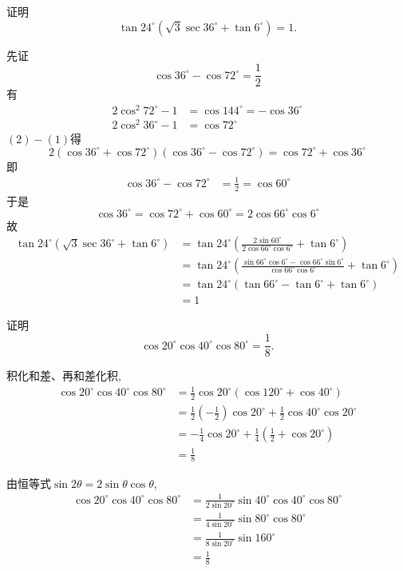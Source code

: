 \begin{questions}
    \question 证明
    \[
    \tan 24^\circ (\sqrt{3} \sec 36^\circ + \tan 6^\circ)=1.
    \]
    \begin{solution}
        先证
        \[
        \cos 36^\circ - \cos 72^\circ = \frac{1}{2}
        \]
        有
        \begin{align*}
        2\cos^2 72^\circ - 1 &= \cos 144^\circ = -\cos 36^\circ \tag{1} \\
        2\cos^2 36^\circ - 1 &= \cos 72^\circ \tag{2}
        \end{align*}
        $(2)-(1)$得
        \[
        2(\cos 36^\circ + \cos 72^\circ)(\cos 36^\circ - \cos 72^\circ) = \cos 72^\circ + \cos 36^\circ
        \]
        即
        \begin{align*}
        \cos 36^\circ - \cos 72^\circ &= \frac{1}{2} = \cos 60^\circ 
        \end{align*}
        于是
        \[
        \cos 36^\circ = \cos 72^\circ + \cos 60^\circ = 2\cos 66^\circ \cos 6^\circ
        \]
        故
        \begin{align*}
        \tan 24^\circ (\sqrt{3} \sec 36^\circ + \tan 6^\circ) 
        &= \tan 24^\circ \left( \frac{2\sin 60^\circ}{2\cos 66^\circ \cos 6^\circ} + \tan 6^\circ \right) \\
        &= \tan 24^\circ \left( \frac{\sin 66^\circ \cos 6^\circ - \cos 66^\circ \sin 6^\circ}{\cos 66^\circ \cos 6^\circ} + \tan 6^\circ \right) \\
        &= \tan 24^\circ (\tan 66^\circ - \tan 6^\circ + \tan 6^\circ) \\
        &= 1
        \end{align*}
    \end{solution}
    
    \question 证明 
    \[
    \cos 20^\circ \cos 40^\circ \cos 80^\circ = \frac{1}{8}.
    \]
    \begin{solution}
        积化和差、再和差化积,
        \begin{align*}
        \cos 20^\circ \cos 40^\circ \cos 80^\circ
        &= \frac{1}{2}\cos 20^\circ (\cos 120^\circ + \cos 40^\circ) \\
        &= \frac{1}{2}\left(-\frac{1}{2}\right)\cos 20^\circ + \frac{1}{2}\cos 40^\circ \cos 20^\circ \\
        &= -\frac{1}{4}\cos 20^\circ + \frac{1}{4}\left(\frac{1}{2}+\cos 20^\circ\right) \\
        &= \frac{1}{8}
        \end{align*}
    \end{solution}
    \begin{solution}
        由恒等式$\sin2\theta=2\sin\theta\cos\theta$,
        \begin{align*}
        \cos 20^\circ \cos 40^\circ \cos 80^\circ
        &= \frac{1}{2\sin 20^\circ}\sin 40^\circ \cos 40^\circ \cos 80^\circ \\
        &= \frac{1}{4\sin 20^\circ}\sin 80^\circ \cos 80^\circ \\
        &= \frac{1}{8\sin 20^\circ}\sin 160^\circ \\
        &= \frac{1}{8}
        \end{align*}
    \end{solution}


\end{questions}
